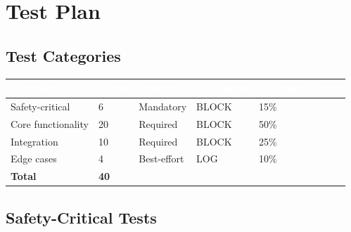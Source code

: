 \documentclass[11pt,letterpaper]{article}
\newcommand{\tableheader}[1]{\textbf{\sffamily\textcolor{white}{#1}}}
\begin{document}
\section{Test Plan}

\subsection{Test Categories}

\begin{center}
\begin{tabularx}{\textwidth}{L{3cm}C{1.5cm}C{1.5cm}L{2cm}X}
\toprule
{}
\tableheader{Category} & \tableheader{Count} & \tableheader{Priority} & \tableheader{On Failure} & \tableheader{Coverage Target} \\
\midrule
Safety-critical & 6 & Mandatory & BLOCK & 15\% \\
Core functionality & 20 & Required & BLOCK & 50\% \\
Integration & 10 & Required & BLOCK & 25\% \\
Edge cases & 4 & Best-effort & LOG & 10\% \\
\midrule
\textbf{Total} & \textbf{40} & & & \\
\bottomrule
\end{tabularx}
\end{center}

\subsection{Safety-Critical Tests}
\end{document}
